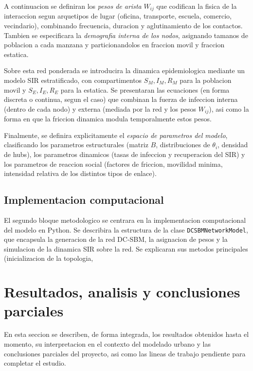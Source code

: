 A continuacion se definiran los \emph{pesos de arista} $W_{ij}$ que codifican la fisica de la interaccion segun arquetipos de lugar (oficina, transporte, escuela, comercio, vecindario), combinando frecuencia, duracion y aglutinamiento de los contactos. 
Tambien se especificara la \emph{demografia interna de los nodos}, asignando tamanos de poblacion a cada manzana y particionandolos en fraccion movil y fraccion estatica.

Sobre esta red ponderada se introducira la dinamica epidemiologica mediante un modelo SIR estratificado, con compartimentos $S_M, I_M, R_M$ para la poblacion movil y $S_E, I_E, R_E$ para la estatica. 
Se presentaran las ecuaciones (en forma discreta o continua, segun el caso) que combinan la fuerza de infeccion interna (dentro de cada nodo) y externa (mediada por la red y los pesos $W_{ij}$), asi como la forma en que la friccion dinamica modula temporalmente estos pesos.

Finalmente, se definira explicitamente el \emph{espacio de parametros del modelo}, clasificando los parametros estructurales (matriz $B$, distribuciones de $\theta_i$, densidad de hubs), los parametros dinamicos (tasas de infeccion y recuperacion del SIR) y los parametros de reaccion social (factores de friccion, movilidad minima, intensidad relativa de los distintos tipos de enlace).

\subsection{Implementacion computacional}

El segundo bloque metodologico se centrara en la implementacion computacional del modelo en Python. 
Se describira la estructura de la clase \texttt{DCSBMNetworkModel}, que encapsula la generacion de la red DC-SBM, la asignacion de pesos y la simulacion de la dinamica SIR sobre la red. 
Se explicaran sus metodos principales (inicializacion de la topologia,

\section{Resultados, analisis y conclusiones parciales}

En esta seccion se describen, de forma integrada, los resultados obtenidos hasta el momento, su interpretacion en el contexto del modelado urbano y las conclusiones parciales del proyecto, asi como las lineas de trabajo pendiente para completar el estudio.

